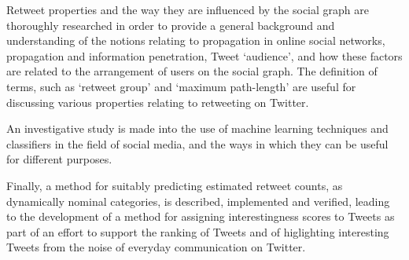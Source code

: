 Retweet properties and the way they are influenced by the social graph are thoroughly researched in order to provide a general background and understanding of the notions relating to propagation in online social networks, propagation and information penetration, Tweet `audience', and how these factors are related to the arrangement of users on the social graph. The definition of terms, such as `retweet group' and `maximum path-length' are useful for discussing various properties relating to retweeting on Twitter.

An investigative study is made into the use of machine learning techniques and classifiers in the field of social media, and the ways in which they can be useful for different purposes.

Finally, a method for suitably predicting estimated retweet counts, as dynamically nominal categories, is described, implemented and verified, leading to the development of a method for assigning interestingness scores to Tweets as part of an effort to support the ranking of Tweets and of higlighting interesting Tweets from the noise of everyday communication on Twitter.
